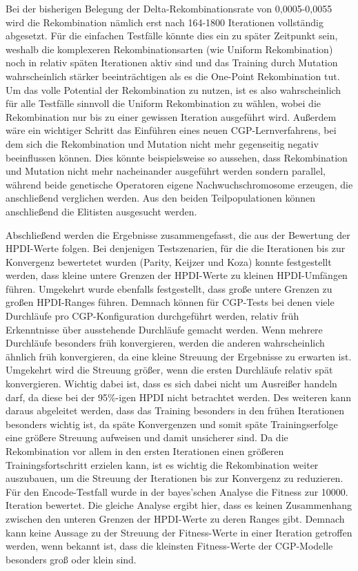 Bei der bisherigen Belegung der Delta-Rekombinationsrate von 0,0005-0,0055 wird die Rekombination nämlich erst nach 164-1800 Iterationen vollständig abgesetzt.
Für die einfachen Testfälle könnte dies ein zu später Zeitpunkt sein, weshalb die komplexeren Rekombinationsarten (wie Uniform Rekombination) noch in relativ späten Iterationen aktiv sind und das Training durch Mutation wahrscheinlich stärker beeinträchtigen als es die One-Point Rekombination tut.
Um das volle Potential der Rekombination zu nutzen, ist es also wahrscheinlich für alle Testfälle sinnvoll die Uniform Rekombination zu wählen, wobei die Rekombination nur bis zu einer gewissen Iteration ausgeführt wird.
Außerdem wäre ein wichtiger Schritt das Einführen eines neuen CGP-Lernverfahrens, bei dem sich die Rekombination und Mutation nicht mehr gegenseitig negativ beeinflussen können.
Dies könnte beispielsweise so aussehen, dass Rekombination und Mutation nicht mehr nacheinander ausgeführt werden sondern parallel, während beide genetische Operatoren eigene Nachwuchschromosome erzeugen, die anschließend verglichen werden.
Aus den beiden Teilpopulationen können anschließend die Elitisten ausgesucht werden.

Abschließend werden die Ergebnisse zusammengefasst, die aus der Bewertung der HPDI-Werte folgen.
Bei denjenigen Testszenarien, für die die Iterationen bis zur Konvergenz bewertetet wurden (Parity, Keijzer und Koza) konnte festgestellt werden, dass kleine untere Grenzen der HPDI-Werte zu kleinen HPDI-Umfängen führen.
Umgekehrt wurde ebenfalls festgestellt, dass große untere Grenzen zu großen HPDI-Ranges führen.
Demnach können für CGP-Tests bei denen viele Durchläufe pro CGP-Konfiguration durchgeführt werden, relativ früh Erkenntnisse über ausstehende Durchläufe gemacht werden.
Wenn mehrere Durchläufe besonders früh konvergieren, werden die anderen wahrscheinlich ähnlich früh konvergieren, da eine kleine Streuung der Ergebnisse zu erwarten ist.
Umgekehrt wird die Streuung größer, wenn die ersten Durchläufe relativ spät konvergieren.
Wichtig dabei ist, dass es sich dabei nicht um Ausreißer handeln darf, da diese bei der 95\%-igen HPDI nicht betrachtet werden.
Des weiteren kann daraus abgeleitet werden, dass das Training besonders in den frühen Iterationen besonders wichtig ist, da späte Konvergenzen und somit späte Trainingserfolge eine größere Streuung aufweisen und damit unsicherer sind.
Da die Rekombination vor allem in den ersten Iterationen einen größeren Trainingsfortschritt erzielen kann, ist es wichtig die Rekombination weiter auszubauen, um die Streuung der Iterationen bis zur Konvergenz zu reduzieren.\\
Für den Encode-Testfall wurde in der bayes'schen Analyse die Fitness zur 10000. Iteration bewertet.
Die gleiche Analyse ergibt hier, dass es keinen Zusammenhang zwischen den unteren Grenzen der HPDI-Werte zu deren Ranges gibt.
Demnach kann keine Aussage zu der Streuung der Fitness-Werte in einer Iteration getroffen werden, wenn bekannt ist, dass die kleinsten Fitness-Werte der CGP-Modelle besonders groß oder klein sind.

